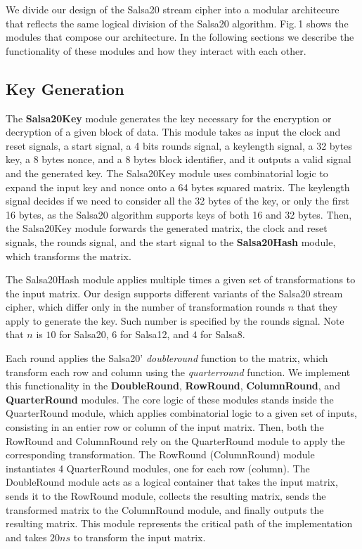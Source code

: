 \documentclass[letterpaper, 10pt, oneside]{article}
\begin{document}
We divide our design of the Salsa20 stream cipher into a modular architecure that reflects the same logical division of the Salsa20 algorithm.
Fig.\,1 shows the modules that compose our architecture.
In the following sections we describe the functionality of these modules and how they interact with each other.

\subsection{Key Generation}
The \textbf{Salsa20Key} module generates the key necessary for the encryption or decryption of a given block of data.
This module takes as input the clock and reset signals, a start signal, a 4 bits rounds signal, a keylength signal, a 32 bytes key, a 8 bytes nonce, and a 8 bytes block identifier, and it outputs a valid signal and the generated key.
The Salsa20Key module uses combinatorial logic to expand the input key and nonce onto a 64 bytes squared matrix.
The keylength signal decides if we need to consider all the 32 bytes of the key, or only the first 16 bytes, as the Salsa20 algorithm supports keys of both 16 and 32 bytes.
Then, the Salsa20Key module forwards the generated matrix, the clock and reset signals, the rounds signal, and the start signal to the \textbf{Salsa20Hash} module, which transforms the matrix.

The Salsa20Hash module applies multiple times a given set of transformations to the input matrix.
Our design supports different variants of the Salsa20 stream cipher, which differ only in the number of transformation rounds $n$ that they apply to generate the key.
Such number is specified by the rounds signal.
Note that $n$ is $10$ for Salsa20, $6$ for Salsa12, and $4$ for Salsa8.

Each round applies the Salsa20' \textit{doubleround} function to the matrix, which transform each row and column using the \textit{quarterround} function.
We implement this functionality in the \textbf{DoubleRound}, \textbf{RowRound}, \textbf{ColumnRound}, and \textbf{QuarterRound} modules.
The core logic of these modules stands inside the QuarterRound module, which applies combinatorial logic to a given set of inputs, consisting in an entier row or column of the input matrix.
Then, both the RowRound and ColumnRound rely on the QuarterRound module to apply the corresponding transformation.
The RowRound (ColumnRound) module instantiates 4 QuarterRound modules, one for each row (column).
The DoubleRound module acts as a logical container that takes the input matrix, sends it to the RowRound module, collects the resulting matrix, sends the transformed matrix to the ColumnRound module, and finally outputs the resulting matrix.
This module represents the critical path of the implementation and takes $20ns$ to transform the input matrix.
\end{document}

